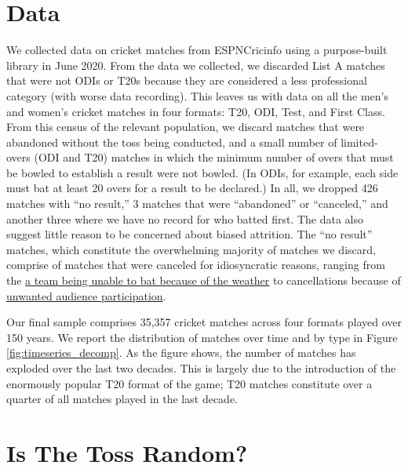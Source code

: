 \documentclass[12pt, letterpaper]{article}
\begin{document}
\section{Data}

We collected data on cricket matches from ESPNCricinfo using a purpose-built library \citep{Willis_python-espncricinfo_A_Python_2022} in June 2020. From the data we collected, we discarded List A matches that were not ODIs or T20s because they are considered a less professional category (with worse data recording). This leaves us with data on all the men's and women's cricket matches in four formats: T20, ODI, Test, and First Class. From this census of the relevant population, we discard matches that were abandoned without the toss being conducted, and a small number of limited-overs (ODI and T20) matches in which the minimum number of overs that must be bowled to establish a result were not bowled. (In ODIs, for example, each side must bat at least 20 overs for a result to be declared.) In all, we dropped 426 matches with ``no result,'' 3 matches that were ``abandoned'' or ``canceled,'' and another three where we have no record for who batted first. The data also suggest little reason to be concerned about biased attrition. The ``no result'' matches, which constitute the overwhelming majority of matches we discard, comprise of matches that were canceled for idiosyncratic reasons, ranging from the \href{https://www.espncricinfo.com/series/shell-tri-series-1991-92-61203/australia-women-vs-england-women-final-66975/full-scorecard}{a team being unable to bat because of the weather} to cancellations because of \href{https://www.espncricinfo.com/series/australia-tour-of-pakistan-1982-83-61392/pakistan-vs-australia-3rd-odi-64196/full-scorecard}{unwanted audience participation}.

Our final sample comprises 35,357 cricket matches across four formats played over 150 years. We report the distribution of matches over time and by type in Figure \ref{fig:timeseries_decomp}. As the figure shows, the number of matches has exploded over the last two decades. This is largely due to the introduction of the enormously popular T20 format of the game; T20 matches constitute over a quarter of all matches played in the last decade.

\section{Is The Toss Random?}
\end{document}

